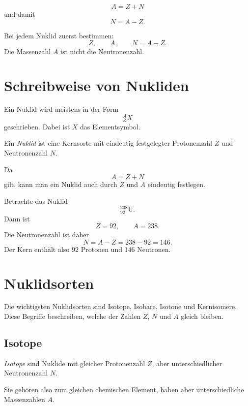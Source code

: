 \begin{formulabox}
\[
    A = Z + N
\]
und damit
\[
    N = A - Z.
\]
\end{formulabox}

\begin{examtipbox}
Bei jedem Nuklid zuerst bestimmen:
\[
    Z,\qquad A,\qquad N=A-Z.
\]
Die Massenzahl $A$ ist nicht die Neutronenzahl.
\end{examtipbox}

\section{Schreibweise von Nukliden}

Ein Nuklid wird meistens in der Form
\[
    {}^A_Z X
\]
geschrieben. Dabei ist $X$ das Elementsymbol.

\begin{definitionbox}
Ein \emph{Nuklid} ist eine Kernsorte mit eindeutig festgelegter Protonenzahl $Z$
und Neutronenzahl $N$.

Da
\[
    A=Z+N
\]
gilt, kann man ein Nuklid auch durch $Z$ und $A$ eindeutig festlegen.
\end{definitionbox}

\begin{examplebox}
Betrachte das Nuklid
\[
    {}^{238}_{92}\mathrm{U}.
\]
Dann ist
\[
    Z=92,
    \qquad
    A=238.
\]
Die Neutronenzahl ist daher
\[
    N=A-Z=238-92=146.
\]
Der Kern enthält also $92$ Protonen und $146$ Neutronen.
\end{examplebox}

\section{Nuklidsorten}

Die wichtigsten Nuklidsorten sind Isotope, Isobare, Isotone und Kernisomere.
Diese Begriffe beschreiben, welche der Zahlen $Z$, $N$ und $A$ gleich bleiben.

\subsection{Isotope}

\begin{definitionbox}
\emph{Isotope} sind Nuklide mit gleicher Protonenzahl $Z$, aber unterschiedlicher
Neutronenzahl $N$.

Sie gehören also zum gleichen chemischen Element, haben aber unterschiedliche
Massenzahlen $A$.
\end{definitionbox}

